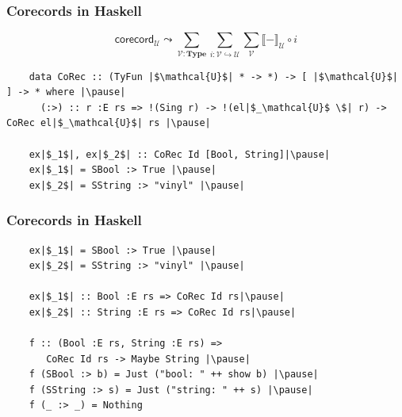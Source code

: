 \documentclass[12pt]{beamer}
\begin{document}
\begin{frame}[fragile]
  \frametitle{Corecords in Haskell}\pause
  \[
    \mathsf{corecord}_\mathcal{U} \leadsto
      \sum_{\mathcal{V}:\mathbf{Type}}
      \sum_{i:\mathcal{V}\hookrightarrow\mathcal{U}}
      \sum_\mathcal{V} \llbracket-\rrbracket_\mathcal{U}\circ i
  \]
  \pause
  \begin{lstlisting}
    data CoRec :: (TyFun |$\mathcal{U}$| * -> *) -> [ |$\mathcal{U}$| ] -> * where |\pause|
      (:>) :: r :E rs => !(Sing r) -> !(el|$_\mathcal{U}$ \$| r) -> CoRec el|$_\mathcal{U}$| rs |\pause|

    ex|$_1$|, ex|$_2$| :: CoRec Id [Bool, String]|\pause|
    ex|$_1$| = SBool :> True |\pause|
    ex|$_2$| = SString :> "vinyl" |\pause|
  \end{lstlisting}
\end{frame}

\begin{frame}[fragile]
  \frametitle{Corecords in Haskell}\pause
  \begin{lstlisting}
    ex|$_1$| = SBool :> True |\pause|
    ex|$_2$| = SString :> "vinyl" |\pause|

    ex|$_1$| :: Bool :E rs => CoRec Id rs|\pause|
    ex|$_2$| :: String :E rs => CoRec Id rs|\pause|

    f :: (Bool :E rs, String :E rs) =>
       CoRec Id rs -> Maybe String |\pause|
    f (SBool :> b) = Just ("bool: " ++ show b) |\pause|
    f (SString :> s) = Just ("string: " ++ s) |\pause|
    f (_ :> _) = Nothing

  \end{lstlisting}
\end{frame}
\end{document}
